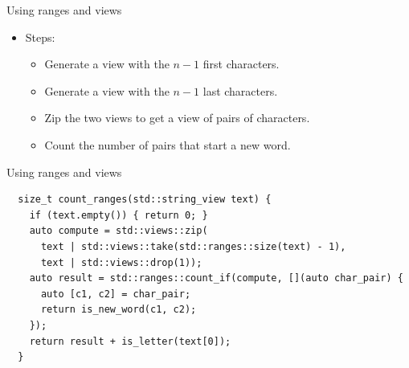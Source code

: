 \begin{frame}[t,fragile]{Using ranges and views}
\begin{itemize}
  \item Steps:
    \begin{itemize}
      \item Generate a view with the $n-1$ first characters.
      \item Generate a view with the $n-1$ last characters.
      \item Zip the two views to get a view of pairs of characters.
      \item Count the number of pairs that start a new word.
    \end{itemize}
\end{itemize}

\begin{block}{Using ranges and views}
\begin{lstlisting}
  size_t count_ranges(std::string_view text) {
    if (text.empty()) { return 0; }
    auto compute = std::views::zip(
      text | std::views::take(std::ranges::size(text) - 1),
      text | std::views::drop(1));
    auto result = std::ranges::count_if(compute, [](auto char_pair) {
      auto [c1, c2] = char_pair;
      return is_new_word(c1, c2);
    });
    return result + is_letter(text[0]);
  }
\end{lstlisting}
\end{block}
\end{frame}